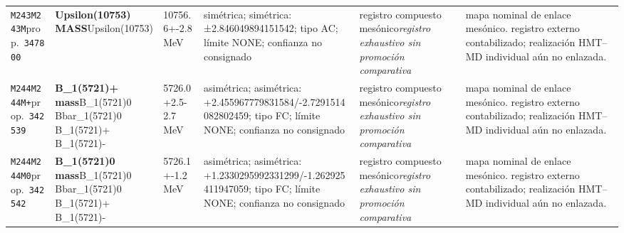 \begin{landscape}
\begin{longtable}{L{1.85cm}L{4.45cm}L{2.35cm}L{4.05cm}L{3.35cm}L{7.15cm}}
\texttt{M243}\newline \texttt{M243M}\newline prop.\ \texttt{347800} & \textbf{Upsilon(10753) MASS}\newline Upsilon(10753) & 10756.6+-2.8\,MeV & simétrica; simétrica: ±2.846049894151542; tipo AC; límite NONE; confianza no consignado & registro compuesto mesónico\newline \emph{registro exhaustivo sin promoción comparativa} & mapa nominal de enlace mesónico. registro externo contabilizado; realización HMT--MD individual aún no enlazada. \\
\texttt{M244}\newline \texttt{M244M+}\newline prop.\ \texttt{342539} & \textbf{B\_\allowbreak{}1(5721)+ mass}\newline B\_\allowbreak{}1(5721)0 \textbar{}\allowbreak{} Bbar\_\allowbreak{}1(5721)0 \textbar{}\allowbreak{} B\_\allowbreak{}1(5721)+ \textbar{}\allowbreak{} B\_\allowbreak{}1(5721)- & 5726.0+2.5-2.7\,MeV & asimétrica; asimétrica: +2.455967779831584/-2.7291514082802459; tipo FC; límite NONE; confianza no consignado & registro compuesto mesónico\newline \emph{registro exhaustivo sin promoción comparativa} & mapa nominal de enlace mesónico. registro externo contabilizado; realización HMT--MD individual aún no enlazada. \\
\texttt{M244}\newline \texttt{M244M0}\newline prop.\ \texttt{342542} & \textbf{B\_\allowbreak{}1(5721)0 mass}\newline B\_\allowbreak{}1(5721)0 \textbar{}\allowbreak{} Bbar\_\allowbreak{}1(5721)0 \textbar{}\allowbreak{} B\_\allowbreak{}1(5721)+ \textbar{}\allowbreak{} B\_\allowbreak{}1(5721)- & 5726.1+-1.2\,MeV & asimétrica; asimétrica: +1.2330295992331299/-1.262925411947059; tipo FC; límite NONE; confianza no consignado & registro compuesto mesónico\newline \emph{registro exhaustivo sin promoción comparativa} & mapa nominal de enlace mesónico. registro externo contabilizado; realización HMT--MD individual aún no enlazada. \\

\end{longtable}
\end{landscape}
